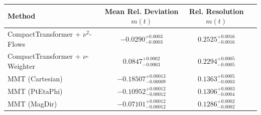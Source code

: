     \begin{tabular}{lccc}
        \toprule
        Method & Mean Rel. Deviation $m(t)$ & Rel. Resolution $m(t)$ \\
        \midrule
        CompactTransformer + $\nu^2$-Flows & $-0.0290^{+0.0003}_{-0.0003}$ & $0.2525^{+0.0016}_{-0.0016}$ \\
        CompactTransformer + $\nu$-Weighter & $0.0847^{+0.0002}_{-0.0003}$ & $0.2294^{+0.0005}_{-0.0005}$ \\
        MMT (Cartesian) & $-0.18507^{+0.00013}_{-0.00009}$ & $0.1363^{+0.0005}_{-0.0003}$ \\
        MMT (PtEtaPhi) & $-0.10952^{+0.00012}_{-0.00012}$ & $0.1306^{+0.0003}_{-0.0004}$ \\
        MMT (MagDir) & $-0.07101^{+0.00012}_{-0.00012}$ & $0.1286^{+0.0002}_{-0.0002}$ \\
        \bottomrule
    \end{tabular}